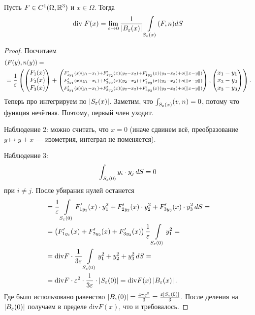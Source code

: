 \begin{thm}
 Пусть $F \in C^{1}(\Omega, \mathbb{R}^{3})$ и $x \in \Omega$. Тогда
 \begin{align*}
  \mathrm{div}\;F(x) = \lim_{\varepsilon \to 0} \frac{1}{\left| B_{\varepsilon}(x) \right|} \int\limits_{S_{\varepsilon}(x)} (F,n) dS
 \end{align*} 
\end{thm}
\begin{proof}
 Посчитаем
 \begin{align*}
  &(F(y), n(y)) = \\
  &= \frac{1}{\varepsilon}\left(  \begin{pmatrix}
   F_1(x) \\
   F_2(x) \\
   F_3(x)
  \end{pmatrix} + \begin{pmatrix}
  \scriptstyle F'_{1y_1}(x) \left( y_1-x_1 \right) + F'_{1y_2}(x) (y_2 -x_2) + F'_{1y_3}(x) (y_3-x_3) + o \left( \left\| x-y \right\| \right) \\
  \scriptstyle F'_{2y_1}(x) \left( y_1-x_1 \right) + F'_{2y_2}(x) (y_2 -x_2) + F'_{2y_3}(x) (y_3-x_3) + o \left( \left\| x-y \right\| \right) \\
  \scriptstyle F'_{3y_1}(x) \left( y_1-x_1 \right) + F'_{3y_2}(x) (y_2 -x_2) + F'_{3y_3}(x) (y_3-x_3) + o \left( \left\| x-y \right\| \right) \\
  \end{pmatrix}, \begin{pmatrix}
   x_1 - y_1 \\
   x_2-y_2\\
   x_3-y_3
  \end{pmatrix}\right)
 .\end{align*} 
Теперь про интегрируем по $|S_\varepsilon(x)|$.  Заметим, что $\int_{S_{\varepsilon}(x)} (v, n) = 0  $, потому что функция нечётная. Поэтому, первый член уходит.

 Наблюдение 2: можно считать, что $x = 0$ (иначе сдвинем всё, преобразование $y \mapsto y + x$ --- изометрия, интеграл не поменяется).

 Наблюдение 3:
 \begin{align*}
  \int_{S_{\varepsilon}(0)} y_i \cdot y_j \, dS = 0
 \end{align*} при $i \neq j$. После убирания нулей останется 
 \begin{align*}
  &= \frac{1}{\varepsilon} \int\limits_{S_{\varepsilon}(0)} F'_{1y_1}(x) \cdot y_1^{2} + F'_{2y_2}(x) \cdot y_2^{2} + F'_{3y_3}(x) \cdot y_3^{2} \, dS = \\
  &= \left( F'_{1y_1}(x) + F'_{2y_2}(x) + F'_{3y_3}(x) \right) \frac{1}{\varepsilon} \int\limits_{S_{\varepsilon}(0)} y_1^{2} = \\
  &= \mathrm{div} F \cdot \frac{1}{3\varepsilon} \int\limits_{S_{\varepsilon}(0)} y_1^{2} + y_2^{2} + y_3^{2} \, dS = \\
  &= \mathrm{div} F \cdot \varepsilon^{2} \cdot \frac{1}{3\varepsilon} \cdot \left| S_{\varepsilon}(0) \right| = \mathrm{div} F(x) \left| B_{\varepsilon}(x) \right|.
 \end{align*}
Где было использовано равенство $|B_{\varepsilon}(0)| = \frac{4\pi\varepsilon^3}{3} = \frac{\varepsilon|S_{\varepsilon}(0)|}{3}$. После деления на $|B_{\varepsilon}(0)|$ получаем в пределе $\mathrm{div} F(x)$, что и требовалось.  
\end{proof}


